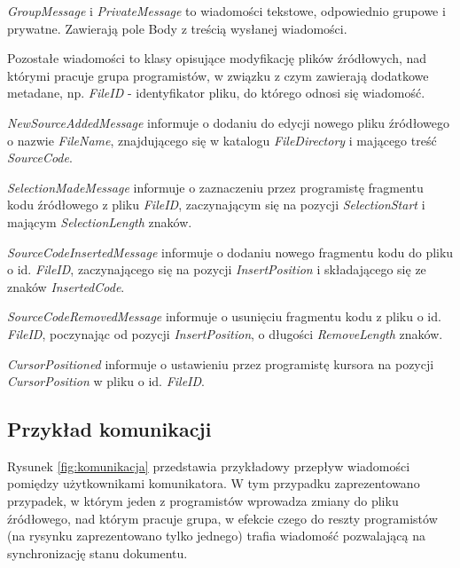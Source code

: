\documentclass[polish,11pt,a4paper,twoside]{article}
\begin{document}
\emph{GroupMessage} i \emph{PrivateMessage} to wiadomości tekstowe, odpowiednio grupowe i prywatne. Zawierają pole Body z treścią wysłanej wiadomości.

Pozostałe wiadomości to klasy opisujące modyfikację plików źródłowych, nad którymi pracuje grupa programistów, w związku z czym zawierają dodatkowe metadane, np. \emph{FileID} - identyfikator pliku, do którego odnosi się wiadomość.

\emph{NewSourceAddedMessage} informuje o dodaniu do edycji nowego pliku źródłowego o nazwie \emph{FileName}, znajdującego się w katalogu \emph{FileDirectory} i mającego treść \emph{SourceCode}.

\emph{SelectionMadeMessage} informuje o zaznaczeniu przez programistę fragmentu kodu źródłowego z pliku \emph{FileID}, zaczynającym się na pozycji \emph{SelectionStart} i mającym \emph{SelectionLength} znaków.

\emph{SourceCodeInsertedMessage} informuje o dodaniu nowego fragmentu kodu do pliku o id. \emph{FileID}, zaczynającego się na pozycji \emph{InsertPosition} i składającego się ze znaków \emph{InsertedCode}.

\emph{SourceCodeRemovedMessage} informuje o usunięciu fragmentu kodu z pliku o id. \emph{FileID}, poczynając od pozycji \emph{InsertPosition}, o długości \emph{RemoveLength} znaków.

\emph{CursorPositioned} informuje o ustawieniu przez programistę kursora na pozycji \emph{CursorPosition} w pliku o id. \emph{FileID}.

\clearpage

\subsection{Przykład komunikacji}
\label{sec:komPrzyklad}

Rysunek \ref{fig:komunikacja} przedstawia przykładowy przepływ wiadomości pomiędzy użytkownikami komunikatora. W tym przypadku zaprezentowano przypadek, w którym jeden z programistów wprowadza zmiany do pliku źródłowego, nad którym pracuje grupa, w efekcie czego do reszty programistów (na rysynku zaprezentowano tylko jednego) trafia wiadomość pozwalającą na synchronizację stanu dokumentu.
\end{document}
